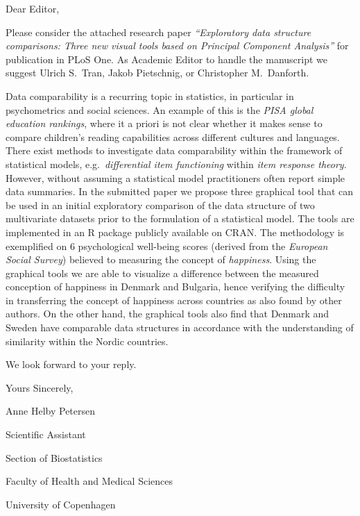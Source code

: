 \documentclass[12pt,a4paper]{article}
\begin{document}
Dear Editor,

\medskip

Please consider the attached research paper \emph{``Exploratory data structure comparisons: Three new visual tools based on Principal Component Analysis''} for publication in PLoS One. As Academic Editor to handle the manuscript we suggest Ulrich S.\ Tran, Jakob Pietschnig, or Christopher M.\ Danforth.

\medskip

Data comparability is a recurring topic in statistics, in particular in psychometrics and social sciences. An example of this is the \emph{PISA global education rankings}, where  it a priori is not clear whether it makes sense to compare children's reading capabilities across different cultures and languages. There exist methods to investigate data comparability within the framework of statistical models, e.g.\ \emph{differential item functioning} within \emph{item response theory}. However, without assuming a statistical model practitioners often report simple data summaries. In the submitted paper we propose three graphical tool that can be used in an initial exploratory comparison of the data structure of two multivariate datasets prior to the formulation of a statistical model. The tools are implemented in an R package publicly available on CRAN. The methodology is exemplified on 6 psychological well-being scores (derived from the \emph{European Social Survey}) believed to measuring the concept of \emph{happiness}. Using the graphical tools we are able to visualize a difference between the measured conception of happiness in Denmark and Bulgaria, hence verifying the difficulty in transferring the concept of happiness across countries as also found by other authors. On the other hand, the graphical tools also find that Denmark and Sweden have comparable data structures in accordance with the understanding of similarity within the Nordic countries. 

\medskip

We look forward to your reply.

\bigskip

Yours Sincerely,

\bigskip\bigskip

Anne Helby Petersen

Scientific Assistant

Section of Biostatistics

Faculty of Health and Medical Sciences

University of Copenhagen
\end{document}
